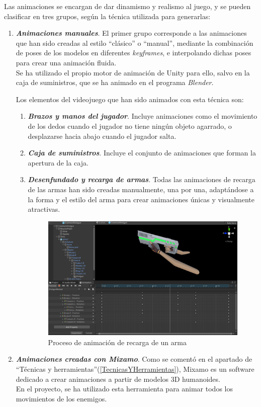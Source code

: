Las animaciones se encargan de dar dinamismo y realismo al juego, y se pueden clasificar en tres grupos, según la técnica utilizada para generarlas:
\begin{enumerate}
  \item \textbf{\textit{Animaciones manuales}}. El primer grupo corresponde a las animaciones que han sido creadas al estilo ``clásico'' o ``manual'', mediante la combinación de poses de los modelos en diferentes \textit{keyframes}, e interpolando dichas poses para crear una animación fluida.\\
  Se ha utilizado el propio motor de animación de Unity para ello, salvo en la caja de suministros, que se ha animado en el programa \textit{Blender}.
  
  Los elementos del videojuego que han sido animados con esta técnica son:
  \begin{enumerate}
  \item \textbf{\textit{Brazos y manos del jugador}}. Incluye animaciones como el movimiento de los dedos cuando el jugador no tiene ningún objeto agarrado, o desplazarse hacia abajo cuando el jugador salta.
  \item \textbf{\textit{Caja de suministros}}. Incluye el conjunto de animaciones que forman la apertura de la caja.
  \item \textbf{\textit{Desenfundado y recarga de armas}}. Todas las animaciones de recarga de las armas han sido creadas manualmente, una por una, adaptándose a la forma y el estilo del arma para crear animaciones únicas y visualmente atractivas.
  \begin{figure}[h]
	\centering
	\includegraphics[scale=0.9]{img/ReloadAnimation.png}
	\caption{Proceso de animación de recarga de un arma}
	\label{fig:AnimaciónRecarga}
    \end{figure}
  \end{enumerate}
  \item \textbf{\textit{Animaciones creadas con Mixamo}}. Como se comentó en el apartado de ``Técnicas y herramientas''(\ref{TecnicasYHerramientas}), Mixamo es un software dedicado a crear animaciones a partir de modelos 3D humanoides.\\
  En el proyecto, se ha utilizado esta herramienta para animar todos los movimientos de los enemigos.
  

\end{enumerate}
